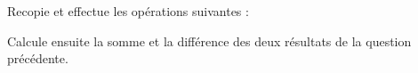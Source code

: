 \begin{myenumerate}
\item Recopie et effectue les opérations suivantes :\par
\begin{center}
\kern2cm
\end{center}
\item Calcule ensuite la somme et la différence des deux résultats de
la question précédente.
\end{myenumerate}
\begin{myenumerate}
  \item \subitem{}\par
\begin{center}
\kern2cm
\end{center}
\par
\item \subitem{}\par
  \begin{center}
    \kern2cm
  \end{center}
\end{myenumerate}
